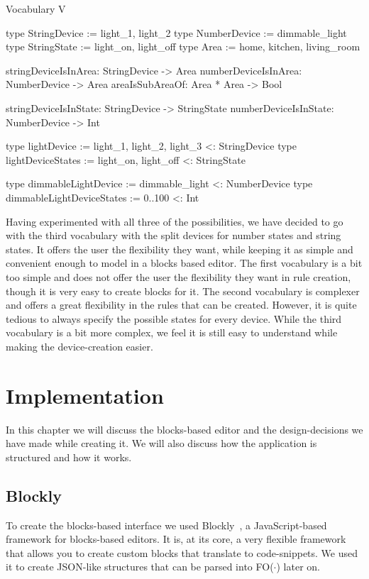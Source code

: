 \documentclass[11pt,a4paper]{report}
\newcommand{\fodot}{FO($\cdot$)\xspace}
\begin{document}
\begin{idplisting}
Vocabulary V {
    type StringDevice := {light_1, light_2}
    type NumberDevice := {dimmable_light}
    type StringState := {light_on, light_off}
    type Area := {home, kitchen, living_room}   

    stringDeviceIsInArea: StringDevice -> Area
    numberDeviceIsInArea: NumberDevice -> Area
    areaIsSubAreaOf: Area * Area -> Bool    

    stringDeviceIsInState: StringDevice -> StringState
    numberDeviceIsInState: NumberDevice -> Int  

    type lightDevice := {light_1, light_2, light_3} <: StringDevice
    type lightDeviceStates := {light_on, light_off} <: StringState  

    type dimmableLightDevice := {dimmable_light} <: NumberDevice
    type dimmableLightDeviceStates := {0..100} <: Int
}
\end{idplisting}

Having experimented with all three of the possibilities, we have decided to go with the third vocabulary with the split devices for number states and string states. It offers the user the flexibility they want, while keeping it as simple and convenient enough to model in a blocks based editor. The first vocabulary is a bit too simple and does not offer the user the flexibility they want in rule creation, though it is very easy to create blocks for it. The second vocabulary is complexer and offers a great flexibility in the rules that can be created. However, it is quite tedious to always specify the possible states for every device. While the third vocabulary is a bit more complex, we feel it is still easy to understand while making the device-creation easier.

\chapter{Implementation}
In this chapter we will discuss the blocks-based editor and the design-decisions we have made while creating it. We will also discuss how the application is structured and how it works.

\section{Blockly}

To create the blocks-based interface we used Blockly~\cite{Blockly}, a JavaScript-based framework for blocks-based editors. It is, at its core, a very flexible framework that allows you to create custom blocks that translate to code-snippets. We used it to create JSON-like structures that can be parsed into \fodot later on.
\end{document}
